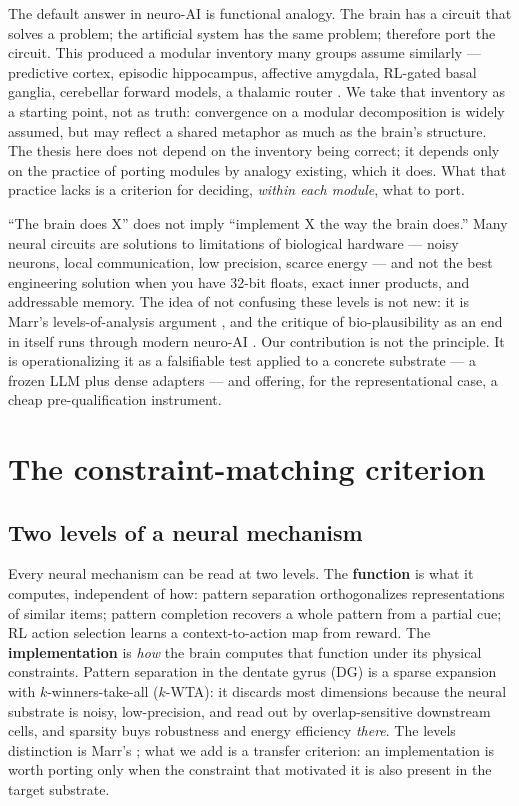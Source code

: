 \documentclass[11pt]{article}
\begin{document}
The default answer in neuro-AI is functional analogy. The brain has a circuit that solves a problem; the artificial system has the same problem; therefore port the circuit. This produced a modular inventory many groups assume similarly --- predictive cortex, episodic hippocampus, affective amygdala, RL-gated basal ganglia, cerebellar forward models, a thalamic router \citep{oreilly2016, sumers2024}. We take that inventory as a starting point, not as truth: convergence on a modular decomposition is widely assumed, but may reflect a shared metaphor as much as the brain's structure. The thesis here does not depend on the inventory being correct; it depends only on the practice of porting modules by analogy existing, which it does. What that practice lacks is a criterion for deciding, \emph{within each module}, what to port.

``The brain does X'' does not imply ``implement X the way the brain does.'' Many neural circuits are solutions to limitations of biological hardware --- noisy neurons, local communication, low precision, scarce energy --- and not the best engineering solution when you have 32-bit floats, exact inner products, and addressable memory. The idea of not confusing these levels is not new: it is Marr's levels-of-analysis argument \citep{marr1982}, and the critique of bio-plausibility as an end in itself runs through modern neuro-AI \citep{jonas2017, lillicrap2019, doerig2023}. Our contribution is not the principle. It is operationalizing it as a falsifiable test applied to a concrete substrate --- a frozen LLM plus dense adapters --- and offering, for the representational case, a cheap pre-qualification instrument.

\section{The constraint-matching criterion}
\subsection{Two levels of a neural mechanism}
Every neural mechanism can be read at two levels. The \textbf{function} is what it computes, independent of how: pattern separation orthogonalizes representations of similar items; pattern completion recovers a whole pattern from a partial cue; RL action selection learns a context-to-action map from reward. The \textbf{implementation} is \emph{how} the brain computes that function under its physical constraints. Pattern separation in the dentate gyrus (DG) is a sparse expansion with $k$-winners-take-all ($k$-WTA): it discards most dimensions because the neural substrate is noisy, low-precision, and read out by overlap-sensitive downstream cells, and sparsity buys robustness and energy efficiency \emph{there}. The levels distinction is Marr's \citep{marr1982}; what we add is a transfer criterion: an implementation is worth porting only when the constraint that motivated it is also present in the target substrate.
\end{document}
